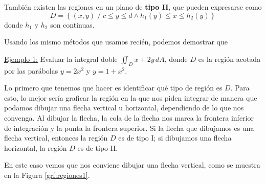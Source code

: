 \documentclass[12pt]{article}
\begin{document}
\vspace{0.2cm}
\vspace{0.2cm}

También existen las regiones en un plano de \textbf{tipo II}, que pueden expresarse como
\[
  D=\left\{(x,y) \;/\; c\leq y\leq d \land h_{1}(y)\leq x\leq h_{2}(y)\right\}
\]
donde $ h_{1} $ y $ h_{2} $ son continuas.

Usando los mismo métodos que usamos recién, podemos demostrar que

\vspace{0.2cm}
\vspace{0.2cm}

\underline{Ejemplo 1:} Evaluar la integral doble $ \iint_{D} x+2y \,dA $, donde $ D $ es la región acotada por las parábolas $ y=2x^2 $ y $ y=1+x^2 $.

Lo primero que tenemos que hacer es identificar qué tipo de región es $ D $. Para esto, lo mejor sería graficar la región en la que nos piden integrar de manera que podamos dibujar una flecha vertical u horizontal, dependiendo de lo que nos convenga. Al dibujar la flecha, la cola de la flecha nos marca la frontera inferior de integración y la punta la frontera superior. Si la flecha que dibujamos es una flecha vertical, entonces la región $ D $ es de tipo I; si dibujamos una flecha horizontal, la región $ D $ es de tipo II.

En este caso vemos que nos conviene dibujar una flecha vertical, como se muestra en la Figura \ref{grf:regiones1}.
\end{document}
